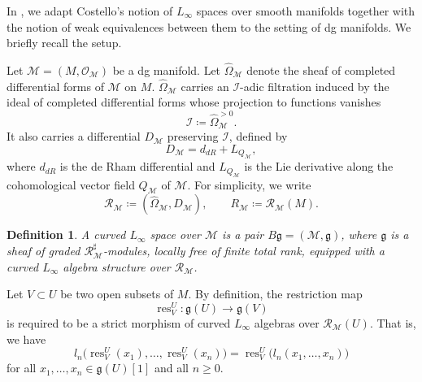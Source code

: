 \documentclass[12pt]{amsart}
\newtheorem{defn}{Definition}[section]
\numberwithin{equation}{section}
\theoremstyle{plain}
\newcommand{\fg}{\mathfrak{g}}
\newcommand{\sI}{\mathcal{I}}
\newcommand{\sM}{\mathcal{M}}
\newcommand{\sO}{\mathcal{O}}
\newcommand{\sR}{\mathcal{R}}
\newcommand{\wOmega}{\widehat{\Omega}}
\begin{document}
	In \cite{cattaneojiang26}, we adapt Costello’s notion of $L_\infty$ spaces over smooth manifolds together with the notion of weak equivalences between them \cite{costello2011geometric} to the setting of dg manifolds. We briefly recall the setup.
	
	Let $\sM=(M, \sO_\sM)$ be a dg manifold. Let $\wOmega_\sM$ denote the sheaf of completed differential forms of $\sM$ on $M$.  $\wOmega_\sM$ carries an $\sI$-adic filtration induced by the ideal of completed differential forms whose projection to functions vanishes
	 \[
	\sI \coloneqq \wOmega_\sM^{>0}.
	\]
	It also carries a differential $D_\sM$ preserving $\sI$, defined by
	\[
	D_\sM  = d_{dR} + L_{Q_\sM},
	\]
	where $d_{dR}$ is the de Rham differential and $L_{Q_\sM}$ is the Lie derivative along the cohomological vector field $Q_\sM$ of $\sM$. For simplicity, we write
	\[
	\sR_\sM \coloneqq (\wOmega_\sM, D_\sM), \qquad R_\sM\coloneqq \sR_\sM(M).
	\]

	\begin{defn}
		A \emph{curved $L_\infty$ space} over $\sM$ is a pair $B\fg=(\sM,\fg)$, where $\fg$ is a sheaf of graded $\sR_\sM^\sharp$-modules, locally free of finite total rank, equipped with a curved $L_\infty$ algebra structure over $\sR_\sM$.
	\end{defn}
	
	Let $V \subset U$ be two open subsets of $M$. By definition, the restriction map 
	\[
	\operatorname{res}^U_V \colon \fg(U) \longrightarrow \fg(V)
	\]
	is required to be a strict morphism of curved $L_\infty$ algebras over $\sR_\sM(U)$. That is, we have
	\[
	l_n\bigl(\operatorname{res}^U_V(x_1), \dots, \operatorname{res}^U_V(x_n)\bigr)
	=
	\operatorname{res}^U_V\bigl(l_n(x_1, \dots, x_n)\bigr)
	\]
	for all $x_1, \dots, x_n \in \fg(U)[1]$ and all $n \ge 0$.
	 
\end{document}
